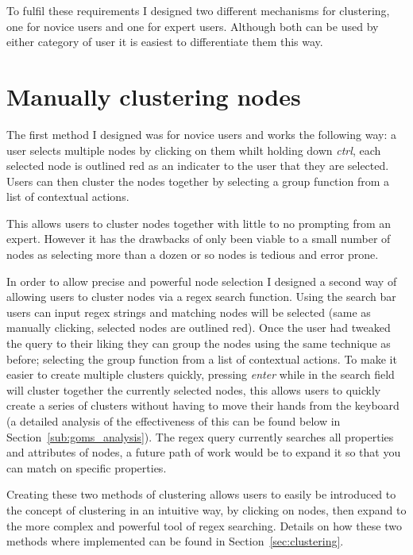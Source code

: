 To fulfil these requirements I designed two different mechanisms for clustering, one for novice users and one for expert users. Although both can be used by either category of user it is easiest to differentiate them this way. 

\section{Manually clustering nodes}
\label{sec:user_defined_clusters}

The first method I designed was for novice users and works the following way: a user selects multiple nodes by clicking on them whilt holding down \textit{ctrl}, each selected node is outlined red as an indicater to the user that they are selected. Users can then cluster the nodes together by selecting a group function from a list of contextual actions. 

This allows users to cluster nodes together with little to no prompting from an expert. However it has the drawbacks of only been viable to a small number of nodes as selecting more than a dozen or so nodes is tedious and error prone. 

In order to allow precise and powerful node selection I designed a second way of allowing users to cluster nodes via a regex search function. Using the search bar users can input regex strings and matching nodes will be selected (same as manually clicking, selected nodes are outlined red). Once the user had tweaked the query to their liking they can group the nodes using the same technique as before; selecting the group function from a list of contextual actions. To make it easier to create multiple clusters quickly, pressing \textit{enter} while in the search field will cluster together the currently selected nodes, this allows users to quickly create a series of clusters without having to move their hands from the keyboard (a detailed analysis of the effectiveness of this can be found below in Section~\ref{sub:goms_analysis}). The regex query currently searches all properties and attributes of nodes, a future path of work would be to expand it so that you can match on specific properties.

Creating these two methods of clustering allows users to easily be introduced to the concept of clustering in an intuitive way, by clicking on nodes, then expand to the more complex and powerful tool of regex searching. Details on how these two methods where implemented can be found in Section~\ref{sec:clustering}.

